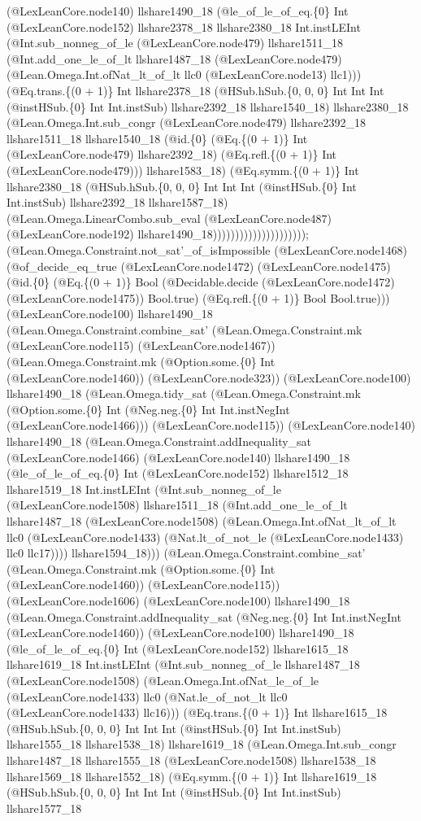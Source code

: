 \documentclass[11pt]{article}
\begin{document}
(@LexLeanCore.node140) llshare1490\_18 (@le\_of\_le\_of\_eq.\{0\} Int (@LexLeanCore.node152) llshare2378\_18 llshare2380\_18 Int.instLEInt (@Int.sub\_nonneg\_of\_le (@LexLeanCore.node479) llshare1511\_18 (@Int.add\_one\_le\_of\_lt llshare1487\_18 (@LexLeanCore.node479) (@Lean.Omega.Int.ofNat\_lt\_of\_lt llc0 (@LexLeanCore.node13) llc1))) (@Eq.trans.\{(0 + 1)\} Int llshare2378\_18 (@HSub.hSub.\{0, 0, 0\} Int Int Int (@instHSub.\{0\} Int Int.instSub) llshare2392\_18 llshare1540\_18) llshare2380\_18 (@Lean.Omega.Int.sub\_congr (@LexLeanCore.node479) llshare2392\_18 llshare1511\_18 llshare1540\_18 (@id.\{0\} (@Eq.\{(0 + 1)\} Int (@LexLeanCore.node479) llshare2392\_18) (@Eq.refl.\{(0 + 1)\} Int (@LexLeanCore.node479))) llshare1583\_18) (@Eq.symm.\{(0 + 1)\} Int llshare2380\_18 (@HSub.hSub.\{0, 0, 0\} Int Int Int (@instHSub.\{0\} Int Int.instSub) llshare2392\_18 llshare1587\_18) (@Lean.Omega.LinearCombo.sub\_eval (@LexLeanCore.node487) (@LexLeanCore.node192) llshare1490\_18))))))))))))))))))))); (@Lean.Omega.Constraint.not\_sat'\_of\_isImpossible (@LexLeanCore.node1468) (@of\_decide\_eq\_true (@LexLeanCore.node1472) (@LexLeanCore.node1475) (@id.\{0\} (@Eq.\{(0 + 1)\} Bool (@Decidable.decide (@LexLeanCore.node1472) (@LexLeanCore.node1475)) Bool.true) (@Eq.refl.\{(0 + 1)\} Bool Bool.true))) (@LexLeanCore.node100) llshare1490\_18 (@Lean.Omega.Constraint.combine\_sat' (@Lean.Omega.Constraint.mk (@LexLeanCore.node115) (@LexLeanCore.node1467)) (@Lean.Omega.Constraint.mk (@Option.some.\{0\} Int (@LexLeanCore.node1460)) (@LexLeanCore.node323)) (@LexLeanCore.node100) llshare1490\_18 (@Lean.Omega.tidy\_sat (@Lean.Omega.Constraint.mk (@Option.some.\{0\} Int (@Neg.neg.\{0\} Int Int.instNegInt (@LexLeanCore.node1466))) (@LexLeanCore.node115)) (@LexLeanCore.node140) llshare1490\_18 (@Lean.Omega.Constraint.addInequality\_sat (@LexLeanCore.node1466) (@LexLeanCore.node140) llshare1490\_18 (@le\_of\_le\_of\_eq.\{0\} Int (@LexLeanCore.node152) llshare1512\_18 llshare1519\_18 Int.instLEInt (@Int.sub\_nonneg\_of\_le (@LexLeanCore.node1508) llshare1511\_18 (@Int.add\_one\_le\_of\_lt llshare1487\_18 (@LexLeanCore.node1508) (@Lean.Omega.Int.ofNat\_lt\_of\_lt llc0 (@LexLeanCore.node1433) (@Nat.lt\_of\_not\_le (@LexLeanCore.node1433) llc0 llc17)))) llshare1594\_18))) (@Lean.Omega.Constraint.combine\_sat' (@Lean.Omega.Constraint.mk (@Option.some.\{0\} Int (@LexLeanCore.node1460)) (@LexLeanCore.node115)) (@LexLeanCore.node1606) (@LexLeanCore.node100) llshare1490\_18 (@Lean.Omega.Constraint.addInequality\_sat (@Neg.neg.\{0\} Int Int.instNegInt (@LexLeanCore.node1460)) (@LexLeanCore.node100) llshare1490\_18 (@le\_of\_le\_of\_eq.\{0\} Int (@LexLeanCore.node152) llshare1615\_18 llshare1619\_18 Int.instLEInt (@Int.sub\_nonneg\_of\_le llshare1487\_18 (@LexLeanCore.node1508) (@Lean.Omega.Int.ofNat\_le\_of\_le (@LexLeanCore.node1433) llc0 (@Nat.le\_of\_not\_lt llc0 (@LexLeanCore.node1433) llc16))) (@Eq.trans.\{(0 + 1)\} Int llshare1615\_18 (@HSub.hSub.\{0, 0, 0\} Int Int Int (@instHSub.\{0\} Int Int.instSub) llshare1555\_18 llshare1538\_18) llshare1619\_18 (@Lean.Omega.Int.sub\_congr llshare1487\_18 llshare1555\_18 (@LexLeanCore.node1508) llshare1538\_18 llshare1569\_18 llshare1552\_18) (@Eq.symm.\{(0 + 1)\} Int llshare1619\_18 (@HSub.hSub.\{0, 0, 0\} Int Int Int (@instHSub.\{0\} Int Int.instSub) llshare1577\_18 
\end{document}

